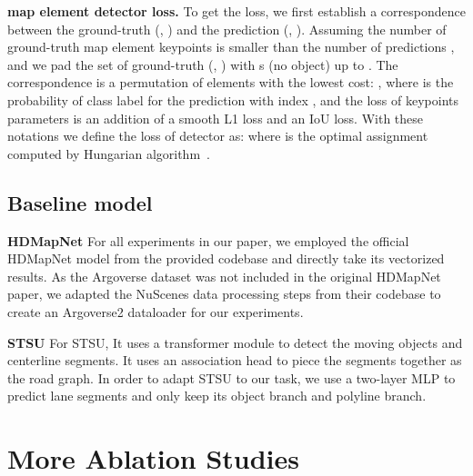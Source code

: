 \documentclass{article}
\theoremstyle{plain}
\theoremstyle{definition}
\theoremstyle{remark}
\begin{document}
\noindent\textbf{map element detector loss.}
To get the loss, we first establish a correspondence between the ground-truth (, ) and the prediction (, ). Assuming the number of ground-truth map element keypoints  is smaller than the number of predictions , and we pad the set of ground-truth (, ) with s (no object) up to . The correspondence  is a permutation of  elements  with the lowest cost: 
 , where  is the probability of class label  for the prediction with index , and the loss of keypoints parameters  is an addition of a smooth L1 loss and an IoU loss. With these notations we define the loss of detector as: 
  where  is the optimal assignment computed by Hungarian algorithm~\citep{kuhn1955hungarian}.

 \subsection{Baseline model}
 \label{sec: baseline model settings}
 \noindent\textbf{HDMapNet}
 For all experiments in our paper, we employed the official HDMapNet model from the provided codebase and directly take its vectorized results. As the Argoverse dataset was not included in the original HDMapNet paper, we adapted the NuScenes data processing steps from their codebase to create an Argoverse2 dataloader for our experiments. 
 
\noindent\textbf{STSU}
For STSU, It uses a transformer module to detect the moving objects and centerline segments. It uses an association head to piece the segments together as the road graph. In order to adapt STSU to our task, we use a two-layer MLP to predict lane segments and only keep its object branch and polyline branch. 


\section{More Ablation Studies}
\label{sec:more_ablations}
\end{document}
